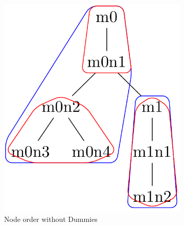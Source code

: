 \documentclass{article}
\begin{document}
\begin{figure}[H]
	\begin{subfigure}{3cm}
		\includegraphics[scale=0.2]{F3C1Tree}
		\caption{Node order without Dummies}
		\label{factory:subim1}
	\end{subfigure}
	\begin{subfigure}{3cm}

\end{subfigure}
\end{figure}
\end{document}
